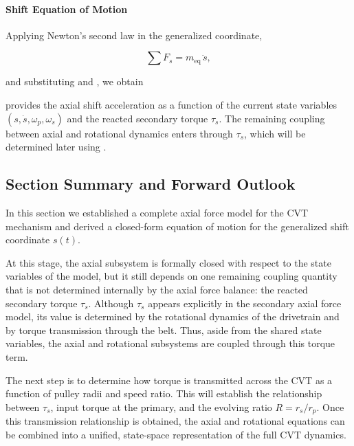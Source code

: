 \documentclass[11pt]{article}
\numberwithin{equation}{section}
\newcounter{theory}
\begin{document}
\paragraph{Shift Equation of Motion}

Applying Newton's second law in the generalized coordinate,

\[
\sum F_s = m_{\mathrm{eq}}\,\ddot s,
\]

and substituting  and ,
we obtain


 provides the axial shift acceleration
as a function of the current state variables
$(s,\dot s,\omega_p,\omega_s)$ and the reacted secondary torque $\tau_s$.
The remaining coupling between axial and rotational dynamics
enters through $\tau_s$, which will be determined later
using .

\subsection{Section Summary and Forward Outlook}\label{sec:axial-summary}

In this section we established a complete axial force model for the CVT
mechanism and derived a closed-form equation of motion for the generalized
shift coordinate $s(t)$.

At this stage, the axial subsystem is formally closed with respect to the
state variables of the model, but it still depends on one remaining
coupling quantity that is not determined internally by the axial force
balance: the reacted secondary torque $\tau_s$.
Although $\tau_s$ appears explicitly in the secondary axial force model,
its value is determined by the rotational dynamics of the drivetrain
and by torque transmission through the belt.
Thus, aside from the shared state variables, the axial and rotational
subsystems are coupled through this torque term.

The next step is to determine how torque is transmitted across the CVT
as a function of pulley radii and speed ratio.
This will establish the relationship between $\tau_s$,
input torque at the primary, and the evolving ratio
$R = r_s / r_p$.
Once this transmission relationship is obtained,
the axial and rotational equations can be combined into a unified,
state-space representation of the full CVT dynamics.
\end{document}
